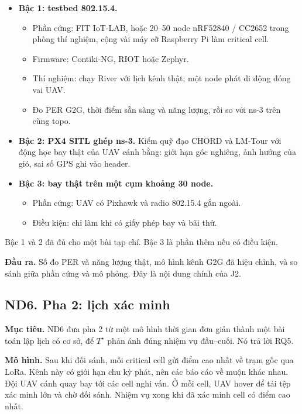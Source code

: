 \begin{itemize}
\tightlist
\item
  \textbf{Bậc 1: testbed 802.15.4.}

  \begin{itemize}
  \tightlist
  \item
    Phần cứng: FIT IoT-LAB, hoặc 20--50 node nRF52840 / CC2652 trong
    phòng thí nghiệm, cộng vài máy cỡ Raspberry Pi làm critical cell.
  \item
    Firmware: Contiki-NG, RIOT hoặc Zephyr.
  \item
    Thí nghiệm: chạy River với lịch kênh thật; một node phát di động
    đóng vai UAV.
  \item
    Đo PER G2G, thời điểm sẵn sàng và năng lượng, rồi so với ns-3 trên
    cùng topo.
  \end{itemize}
\item
  \textbf{Bậc 2: PX4 SITL ghép ns-3.} Kiểm quỹ đạo CHORD và LM-Tour với
  động học bay thật của UAV cánh bằng: giới hạn góc nghiêng, ảnh hưởng
  của gió, sai số GPS ghi vào header.
\item
  \textbf{Bậc 3: bay thật trên một cụm khoảng 30 node.}

  \begin{itemize}
  \tightlist
  \item
    Phần cứng: UAV có Pixhawk và radio 802.15.4 gắn ngoài.
  \item
    Điều kiện: chỉ làm khi có giấy phép bay và bãi thử.
  \end{itemize}
\end{itemize}

Bậc 1 và 2 đã đủ cho một bài tạp chí. Bậc 3 là phần thêm nếu có điều
kiện.

\textbf{Đầu ra.} Số đo PER và năng lượng thật, mô hình kênh G2G đã hiệu
chỉnh, và so sánh giữa phần cứng và mô phỏng. Đây là nội dung chính của
J2.

\subsection{ND6. Pha 2: lịch xác minh}

\textbf{Mục tiêu.} ND6 đưa pha 2 từ một mô hình thời gian đơn giản thành
một bài toán lập lịch có cơ sở, để $T^\star$ phản ánh đúng nhiệm vụ đầu--cuối.
Nó trả lời RQ5.

\textbf{Mô hình.} Sau khi đối sánh, mỗi critical cell gửi điểm cao nhất
về trạm gốc qua LoRa. Kênh này có giới hạn chu kỳ phát, nên các báo cáo
về muộn khác nhau. Đội UAV cánh quay bay tới các cell nghi vấn. Ở mỗi
cell, UAV hover để tải tệp xác minh lớn và chờ đối sánh. Nhiệm vụ xong
khi đã xác minh cell có điểm cao nhất.

